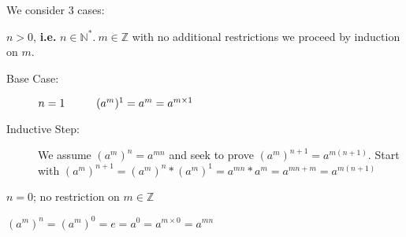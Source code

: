 \documentclass[10pt]{article}
\begin{document}
\begin{description}
		\begin{description}
			\item[Proof:] We consider 3 cases:
			\item[Case 1:] $n > 0$, \textbf{i.e.} $n \in \mathbb{N}^*. \: m \in \mathbb{Z}$ with no additional restrictions we proceed by induction on $m$.
			\begin{description}
				\item[Base Case:] $n=1 \hspace{10mm} (a^m)^1 = a^m = a^{m \times 1}$
				\item[Inductive Step:] We assume $(a^m)^n = a^{mn}$ and seek to prove $(a^m)^{n+1} = a^{m(n+1)}$. Start with $(a^m)^{n+1} = (a^m)^n * (a^m)^1 = a^{mn} * a^m = a^{mn+m} = a^{m(n+1)}$
			\end{description}
			\item[Case 2:] $n=0$; no restriction on $m \in \mathbb{Z}$
			\item $(a^m)^n = (a^m)^0 = e = a^0 = a^{m \times 0} = a^{mn}$
		\end{description}
	\end{description}
	
\end{document}
